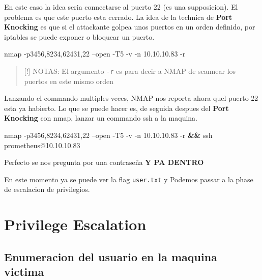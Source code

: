 \documentclass{assets/ipesethesis}
\newenvironment{Shaded}{\begin{snugshade}}{\end{snugshade}}
\newcommand{\FunctionTok}[1]{\textcolor[rgb]{0.00,0.00,0.00}{#1}}
\newcommand{\KeywordTok}[1]{\textcolor[rgb]{0.13,0.29,0.53}{\textbf{#1}}}
\newcommand{\NormalTok}[1]{#1}
\begin{document}
En este caso la idea seria connectarse al puerto 22 (es una supposicion). El problema es que este puerto esta cerrado.
La idea de la technica de \textbf{Port Knocking} es que si el attackante golpea unos puertos en un orden definido, por
iptables se puede exponer o bloquear un puerto.

\begin{Shaded}
\begin{Highlighting}[]
\FunctionTok{nmap}\NormalTok{ -p3456,8234,62431,22 --open -T5 -v -n 10.10.10.83 -r}
\end{Highlighting}
\end{Shaded}

\begin{quote}
{[}!{]} NOTAS: El argumento \texttt{-r} es para decir a NMAP de scannear los puertos en este mismo orden
\end{quote}

Lanzando el commando multiples veces, NMAP nos reporta ahora quel puerto 22 esta ya habierto.
Lo que se puede hacer es, de seguida despues del \textbf{Port Knocking} con nmap, lanzar un commando
ssh a la maquina.

\begin{Shaded}
\begin{Highlighting}[]
\FunctionTok{nmap}\NormalTok{ -p3456,8234,62431,22 --open -T5 -v -n 10.10.10.83 -r }\KeywordTok{&&} \FunctionTok{ssh}\NormalTok{ prometheus@10.10.10.83}
\end{Highlighting}
\end{Shaded}

Perfecto se nos pregunta por una contraseña \textbf{Y PA DENTRO}

En este momento ya se puede ver la flag \texttt{user.txt} y Podemos passar a la phase de escalacion de privilegios.

\hypertarget{privilege-escalation}{%
\section*{Privilege Escalation}\label{privilege-escalation}}

\hypertarget{enumeracion-del-usuario-en-la-maquina-victima}{%
\subsection*{Enumeracion del usuario en la maquina victima}\label{enumeracion-del-usuario-en-la-maquina-victima}}
\end{document}
